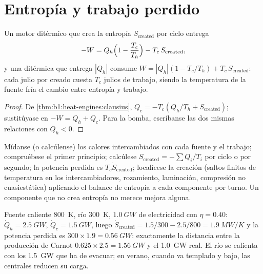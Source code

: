 \section{Entropía y trabajo perdido}

\begin{theorem}\label{thm:b1:heat-engines:lostwork}
Un motor ditérmico que crea la entropía $S_{\mathrm{created}}$ por ciclo
entrega
\[
-W = Q_h\Bigl(1 - \frac{T_c}{T_h}\Bigr) - T_c\,S_{\mathrm{created}} ,
\]
y una  ditérmica que entrega $|Q_h|$ consume
$W = |Q_h|(1 - T_c/T_h) + T_c\,S_{\mathrm{created}}$: cada julio por 
creado cuesta $T_c$ julios de trabajo, siendo la temperatura de la fuente
fría el cambio entre entropía y trabajo.
\end{theorem}

\begin{proof}
De \cref{thm:b1:heat-engines:clausius}, $Q_c = -T_c(Q_h/T_h + S_{\mathrm{created}})$;
sustitúyase en $-W = Q_h + Q_c$. Para la bomba, escríbanse las dos mismas
relaciones con $Q_h < 0$.
\end{proof}

\begin{method}\label{meth:b1:heat-engines:audit}
Mídanse (o calcúlense) los calores intercambiados con cada fuente y el
trabajo; compruébese el primer principio; calcúlese $S_{\mathrm{created}} = -\sum Q_i/T_i$
por ciclo o por segundo; la potencia perdida es $T_c\dot S_{\mathrm{created}}$;
localícese la creación (saltos finitos de temperatura en los
intercambiadores, rozamiento, laminación, compresión no cuasiestática)
aplicando el balance de entropía a cada componente por turno. Un
componente que no crea entropía no merece mejora alguna.
\end{method}

\begin{example}\label{ex:b1:heat-engines:audit}
Fuente caliente \qty{800}{K}, río \qty{300}{K}, $\qty{1.0}{GW}$ de electricidad
con $\eta = 0.40$: $\dot Q_h = \qty{2.5}{GW}$, $\dot Q_c = \qty{1.5}{GW}$, luego
$\dot S_{\mathrm{created}} = 1.5/300 - 2.5/800 = \qty{1.9}{MW/K}$ y la potencia
perdida es $300 \times 1.9 = \qty{0.56}{GW}$: exactamente la distancia entre
la producción de Carnot $0.625 \times 2.5 = \qty{1.56}{GW}$ y el \qty{1.0}{GW} real.
El río se calienta con los \qty{1.5}{GW} que ha de evacuar; en verano,
cuando va templado y bajo, las centrales reducen su carga.
\end{example}

